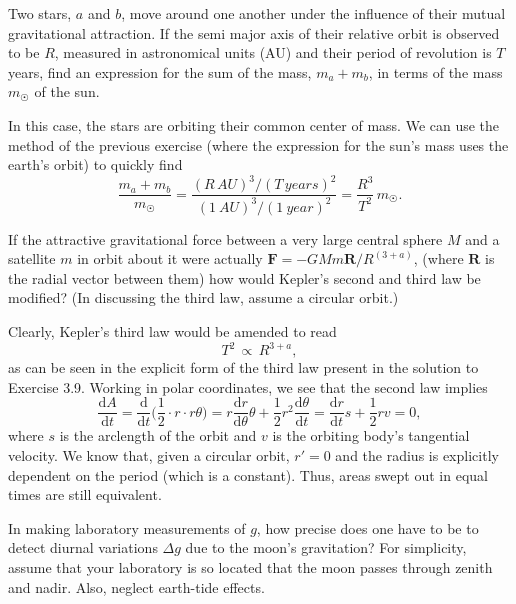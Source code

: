 \documentclass[../feynman-lectures-on-physics.tex]{subfiles}
\begin{document}
\begin{questions}
	\question Two stars, $a$ and $b$, move around one another under the influence of their mutual gravitational attraction. If the semi major axis of their relative orbit is observed to be $R$, measured in astronomical units (AU) and their period of revolution is $T$ years, find an expression for the sum of the mass, $m_a + m_b$, in terms of the mass $m_\Sun$ of the sun.

	\begin{solution}
		In this case, the stars are orbiting their common center of mass. We can use the method of the previous exercise (where the expression for the sun's mass uses the earth's orbit) to quickly find
		\[
			\frac{m_a+m_b}{m_\Sun} = \frac{(R\,\si{AU})^3 / (T\,\si{years})^2}{(\SI{1}{AU})^3 / (\SI{1}{year})^2} = \frac{R^3}{T^2}\,m_\Sun
		.\] 
	\end{solution}

	\question If the attractive gravitational force between a very large central sphere $M$ and a satellite $m$ in orbit about it were actually $\mathbf{F} = -GMm\mathbf{R}/R^{(3+a)}$, (where $\mathbf{R}$ is the radial vector between them) how would Kepler's second and third law be modified? (In discussing the third law, assume a circular orbit.) 

	\begin{solution}
		Clearly, Kepler's third law would be amended to read
		\[
			T^2\,\propto\,R^{3+a},
		\] 
		as can be seen in the explicit form of the third law present in the solution to Exercise 3.9. Working in polar coordinates, we see that the second law implies
		\[
			\frac{\mathrm{d}A}{\mathrm{d}t} = \frac{\mathrm{d}}{\mathrm{d}t}\Big(\frac{1}{2}\cdot{r}\cdot{r\theta}\Big) = r\frac{\mathrm{d}r}{\mathrm{d}\theta}\theta + \frac{1}{2}r^2\frac{\mathrm{d}\theta}{\mathrm{d}t} = \frac{\mathrm{d}r}{\mathrm{d}t}{s} + \frac{1}{2}{r}{v} = 0
		,\]
		where $s$ is the arclength of the orbit and $v$ is the orbiting body's tangential velocity. We know that, given a circular orbit, $r' = 0$ and the radius is explicitly dependent on the period (which is a constant). Thus, areas swept out in equal times are still equivalent.
	\end{solution}

	\question In making laboratory measurements of $g$, how precise does one have to be to detect diurnal variations $\Delta{g}$ due to the moon's gravitation? For simplicity, assume that your laboratory is so located that the moon passes through zenith and nadir. Also, neglect earth-tide effects.


\end{questions}
\end{document}
